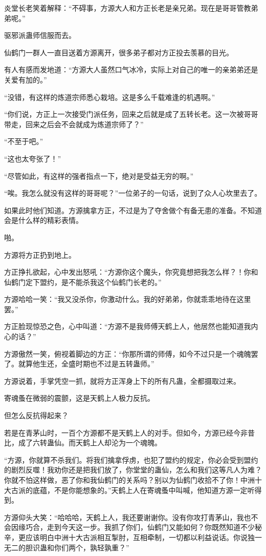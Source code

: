 \begin{this_body}
炎堂长老笑着解释：“不碍事，方源大人和方正长老是亲兄弟。现在是哥哥管教弟弟呢。”

驱邪派蛊师信服而去。

仙鹤门一群人一直目送着方源离开，很多弟子都对方正投去羡慕的目光。

有人有感而发地道：“方源大人虽然口气冰冷，实际上对自己的唯一的亲弟弟还是关爱有加的。”

“没错，有这样的炼道宗师悉心栽培。这是多么千载难逢的机遇啊。”

“你们说，方正上一次接受门派任务，回来之后就是成了五转长老。这一次被哥哥带走，回来之后会不会就成为炼道宗师了？”

“不至于吧。”

“这也太夸张了！”

“尽管如此，有这样的强者指点一下，绝对是受益无穷的啊。”

“唉。我怎么就没有这样的哥哥呢？”一位弟子的一句话，说到了众人心坎里去了。

如果此时他们知道。方源擒拿方正，不过是为了夺舍做个有备无患的准备。不知道会是什么样的精彩表情。

啪。

方源将方正扔到地上。

方正挣扎欲起，心中发出怒吼：“方源你这个魔头，你究竟想把我怎么样？！你和仙鹤门定下盟约，是不能杀我这个仙鹤门长老的。”

方源哈哈一笑：“我又没杀你，你激动什么。我的好弟弟，你就乖乖地待在这里罢。”

方正脸现惊恐之色，心中叫道：“方源不是我师傅天鹤上人，他居然也能知道我内心的话？”

方源傲然一笑，俯视着脚边的方正：“你那所谓的师傅，如今不过只是一个魂魄罢了。就算他生还，全盛时期也不过是五转蛊师。”

方源说着，手掌凭空一抓，就将方正浑身上下的所有凡蛊，全都摄取过来。

寄魂蚤在微弱的震颤，这是天鹤上人极力反抗。

但怎么反抗得起来？

若是在青茅山时，一百个方源都不是天鹤上人的对手。但如今，方源已经今非昔比，成了六转蛊仙。而天鹤上人却沦为一个魂魄。

“方源，你就算不杀我们。将我们擒拿俘虏，也犯了盟约的规定，你必会受到盟约的剧烈反噬！我劝你还是把我们放了，你堂堂的蛊仙，怎么和我们这等凡人为难？你就不怕这样做，恶了你和我仙鹤门的关系吗？别以为仙鹤门收拾不了你！中洲十大古派的底蕴，不是你能想象的。”天鹤上人在寄魂蚤中叫喊，他知道方源一定听得到。

方源仰头大笑：“哈哈哈，天鹤上人，我还要谢谢你。没有你攻打青茅山，我也不会因缘巧合，走到今天这一步。我抓了你们，仙鹤门又能如何？你既然知道不少秘辛，更应该明白中洲十大古派相互掣肘，互相牵制，一切都以利益说话。你说独一无二的胆识蛊和你们两个，孰轻孰重？”


\end{this_body}
